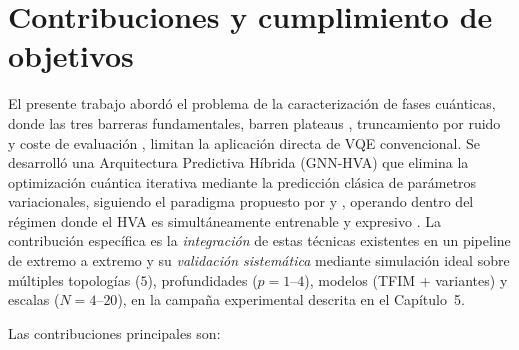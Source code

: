 \documentclass[11pt,a4paper,spanish]{book}
\begin{document}
\section{Contribuciones y cumplimiento de objetivos}

El presente trabajo abordó el problema de la caracterización de fases cuánticas, donde las tres barreras fundamentales, barren plateaus \citep{mcclean2018}, truncamiento por ruido \citep{mele2026} y coste de evaluación \citep{tilly2022}, limitan la aplicación directa de VQE convencional. Se desarrolló una Arquitectura Predictiva Híbrida (GNN-HVA) que elimina la optimización cuántica iterativa mediante la predicción clásica de parámetros variacionales, siguiendo el paradigma propuesto por \citet{miao2024} y \citet{zhang2025}, operando dentro del régimen donde el HVA es simultáneamente entrenable \citep{cerezo2021} y expresivo \citep{wiersema2020}. La contribución específica es la \emph{integración} de estas técnicas existentes en un pipeline de extremo a extremo y su \emph{validación sistemática} mediante simulación ideal sobre múltiples topologías ($5$), profundidades ($p = 1$--$4$), modelos (TFIM + variantes) y escalas ($N = 4$--$20$), en la campaña experimental descrita en el Capítulo~5.

Las contribuciones principales son:
\end{document}
